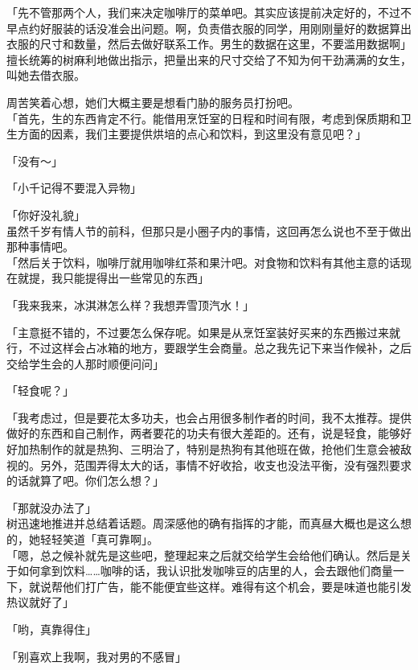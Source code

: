 「先不管那两个人，我们来决定咖啡厅的菜单吧。其实应该提前决定好的，不过不早点约好服装的话没准会出问题。啊，负责借衣服的同学，用刚刚量好的数据算出衣服的尺寸和数量，然后去做好联系工作。男生的数据在这里，不要滥用数据啊」\\

擅长统筹的树麻利地做出指示，把量出来的尺寸交给了不知为何干劲满满的女生，叫她去借衣服。

周苦笑着心想，她们大概主要是想看门胁的服务员打扮吧。\\

「首先，生的东西肯定不行。能借用烹饪室的日程和时间有限，考虑到保质期和卫生方面的因素，我们主要提供烘培的点心和饮料，到这里没有意见吧？」

「没有～」

「小千记得不要混入异物」

「你好没礼貌」\\

虽然千岁有情人节的前科，但那只是小圈子内的事情，这回再怎么说也不至于做出那种事情吧。\\

「然后关于饮料，咖啡厅就用咖啡红茶和果汁吧。对食物和饮料有其他主意的话现在就提，我只能提得出一些常见的东西」

「我来我来，冰淇淋怎么样？我想弄雪顶汽水！」

「主意挺不错的，不过要怎么保存呢。如果是从烹饪室装好买来的东西搬过来就行，不过这样会占冰箱的地方，要跟学生会商量。总之我先记下来当作候补，之后交给学生会的人那时顺便问问」

「轻食呢？」

「我考虑过，但是要花太多功夫，也会占用很多制作者的时间，我不太推荐。提供做好的东西和自己制作，两者要花的功夫有很大差距的。还有，说是轻食，能够好好加热制作的就是热狗、三明治了，特别是热狗有其他班在做，抢他们生意会被敌视的。另外，范围弄得太大的话，事情不好收拾，收支也没法平衡，没有强烈要求的话就算了吧。你们怎么想？」

「那就没办法了」\\

树迅速地推进并总结着话题。周深感他的确有指挥的才能，而真昼大概也是这么想的，她轻轻笑道「真可靠啊」。\\

「嗯，总之候补就先是这些吧，整理起来之后就交给学生会给他们确认。然后是关于如何拿到饮料……咖啡的话，我认识批发咖啡豆的店里的人，会去跟他们商量一下，就说帮他们打广告，能不能便宜些这样。难得有这个机会，要是味道也能引发热议就好了」

「哟，真靠得住」

「别喜欢上我啊，我对男的不感冒」\\


